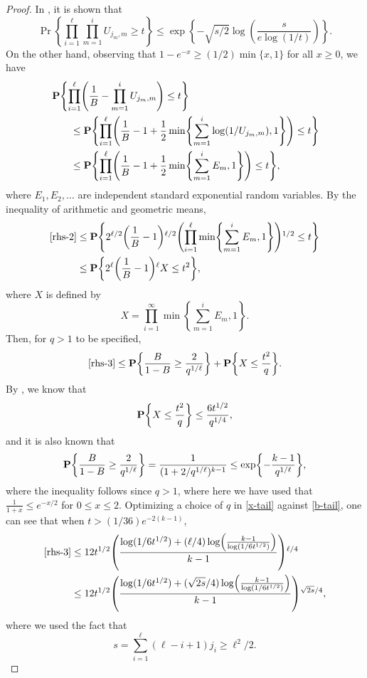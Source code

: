 \begin{proof}
  In \cite[Lemma 1]{finding-adam}, it is shown that
  \[
    \Pr\left\{ \prod_{i = 1}^\ell \prod_{m = 1}^i U_{j_m, m} \ge t \right\} \le \exp\left\{ - \sqrt{s/2} \log \left( \frac{s}{e \log (1/t) } \right) \right\} .
  \]
  On the other hand, observing that
  $1 - e^{-x} \ge (1/2) \min\{x, 1\}$ for all $x \ge 0$, we have
  \begin{align}
    &\Pr\left\{ \prod_{i = 1}^\ell \left(\frac{1}{B} - \prod_{m = 1}^i U_{j_m, m} \right) \le t \right\} \notag \\
    &\qquad \le \Pr\left\{ \prod_{i = 1}^\ell \left(\frac{1}{B} - 1 + \frac{1}{2} \min\left\{ \sum_{m = 1}^i \log(1/U_{j_m, m}), 1 \right\} \right) \le t \right\} \notag \\
        &\qquad \le \Pr\left\{ \prod_{i = 1}^\ell \left(\frac{1}{B} - 1 + \frac{1}{2} \min\left\{ \sum_{m = 1}^i E_m, 1 \right\}\right) \le t \right\} , \eqlabel{rhs-2}
  \end{align}
  where $E_1, E_2, \dots$ are independent standard exponential random
  variables. By the inequality of arithmetic and geometric means,
  \begin{align}
    \eqref{rhs-2} &\le \Pr\left\{ 2^{\ell/2} \left(\frac{1}{B} - 1\right)^{\ell/2} \left(\prod_{i = 1}^\ell \min\left\{ \sum_{m = 1}^i E_m, 1 \right\} \right)^{1/2} \le t \right\} \notag \\
        &\le \Pr\left\{ 2^\ell \left(\frac{1}{B} - 1\right)^\ell X \le t^2\right\} , \eqlabel{rhs-3}
  \end{align}
  where $X$ is defined by
  \[
    X = \prod_{i = 1}^\infty \min\left\{ \sum_{m = 1}^i E_m, 1 \right\} .
  \]
  Then, for $q > 1$ to be specified,
  \[
    \eqref{rhs-3} \le \Pr\left\{\frac{B}{1 - B} \ge \frac{2}{q^{1/\ell}} \right\} + \Pr\left\{X \le \frac{t^2}{q}\right\} .
  \]
  By \cite[Lemma 2]{finding-adam}, we know that
  \begin{equation}
    \Pr\left\{X \le \frac{t^2}{q}\right\} \le \frac{6 t^{1/2}}{q^{1/4}} , \eqlabel{x-tail}
  \end{equation}
  and it is also known that
  \begin{equation}
    \Pr\left\{ \frac{B}{1 - B} \ge \frac{2}{q^{1/\ell}} \right\} = \frac{1}{(1 + 2/q^{1/\ell})^{k - 1}} \le \exp\left\{- \frac{k - 1}{q^{1/\ell}}\right\} , \eqlabel{b-tail}
  \end{equation}
  where the inequality follows since $q > 1$, where here we have used
  that $\frac{1}{1 + x} \le e^{-x/2}$ for $0 \le x \le 2$.  Optimizing
  a choice of $q$ in \eqref{x-tail} against \eqref{b-tail}, one can
  see that when $t > (1/36) e^{-2 (k - 1)}$,
  \begin{align*}
    \eqref{rhs-3} &\le 12 t^{1/2} \left( \frac{\log(1/6t^{1/2}) + (\ell/4) \log \left( \frac{k - 1}{\log (1/6t^{1/2})} \right)}{k - 1} \right)^{\ell/4} \\
                &\le 12 t^{1/2} \left( \frac{\log(1/6t^{1/2}) + (\sqrt{2s}/4) \log \left( \frac{k - 1}{\log (1/6t^{1/2})} \right) }{k - 1} \right)^{\sqrt{2s}/4} ,
  \end{align*}
  where we used the fact that
  \[
    s = \sum_{i = 1}^\ell (\ell - i + 1) j_i \ge \ell^2/2 .
  \]
  

\end{proof}
